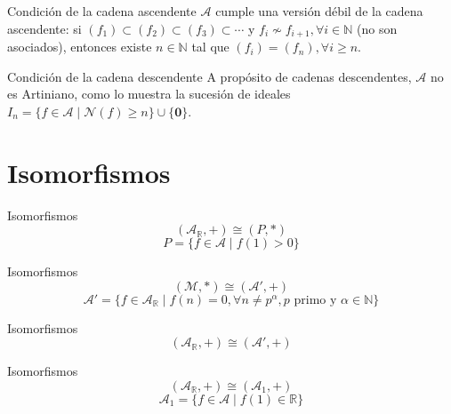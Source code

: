 \documentclass{beamer}
\begin{document}
\begin{frame}{Condición de la cadena ascendente}
    $\mathcal{A}$ cumple una versión débil de la cadena ascendente: si $(f_1) \subset (f_2) \subset (f_3) \subset \cdots$ y $f_i \nsim f_{i+1}, \forall i \in \mathbb{N}$ (no son asociados), entonces existe $n \in \mathbb{N}$ tal que $(f_i) = (f_n), \forall i \ge n$.
\end{frame}

\begin{frame}{Condición de la cadena descendente}
    A propósito de cadenas descendentes, $\mathcal{A}$ no es Artiniano, como lo muestra la sucesión de ideales $I_n = \{ f \in \mathcal{A} \mid \mathcal{N}(f) \ge n \} \cup \{ \mathbf{0} \}$.
\end{frame}

\section{Isomorfismos}

\begin{frame}{Isomorfismos}
    \begin{equation*}
        (\mathcal{A}_{\mathbb{R}}, +) \cong (P, *)
    \end{equation*}
    \begin{equation*}
        P = \{ f \in \mathcal{A} \mid f(1) > 0 \}
    \end{equation*}
\end{frame}

\begin{frame}{Isomorfismos}
    \begin{equation*}
        (\mathcal{M}, *) \cong (\mathcal{A}', +)
    \end{equation*}
    \begin{equation*}
        \mathcal{A}' = \{ f \in \mathcal{A}_{\mathbb{R}} \mid f(n) = 0, \forall n \ne p^\alpha, p \text{ primo y } \alpha \in \mathbb{N} \}
    \end{equation*}
\end{frame}

\begin{frame}{Isomorfismos}
    \begin{equation*}
        (\mathcal{A}_{\mathbb{R}}, +) \cong (\mathcal{A}', +)
    \end{equation*}
\end{frame}

\begin{frame}{Isomorfismos}
    \begin{equation*}
        (\mathcal{A}_{\mathbb{R}}, +) \cong (\mathcal{A}_1, +)
    \end{equation*}
    \begin{equation*}
        \mathcal{A}_1 = \{ f \in \mathcal{A} \mid f(1) \in \mathbb{R} \}
    \end{equation*}
\end{frame}
\end{document}
